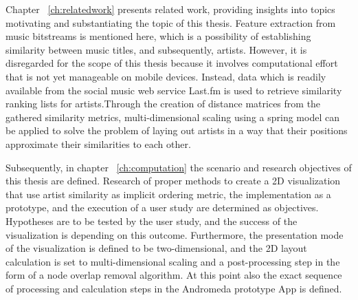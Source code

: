 Chapter ~\ref{ch:relatedwork} presents related work, providing insights into topics motivating and substantiating the topic of this thesis. Feature extraction from music bitstreams is mentioned here, which is a possibility of establishing similarity between music titles, and subsequently, artists. However, it is disregarded for the scope of this thesis because it involves computational effort that is not yet manageable on mobile devices. Instead, data which is readily available from the social music web service Last.fm is used to retrieve similarity ranking lists for artists.Through the creation of distance matrices from the gathered similarity metrics, multi-dimensional scaling using a spring model can be applied to solve the problem of laying out artists in a way that their positions approximate their similarities to each other.

Subsequently, in chapter ~\ref{ch:computation} the scenario and research objectives of this thesis are defined. Research of proper methods to create a 2D visualization that use artist similarity as implicit ordering metric, the implementation as a prototype, and the execution of a user study are determined as objectives. Hypotheses are to be tested by the user study, and the success of the visualization is depending on this outcome. Furthermore, the presentation mode of the visualization is defined to be two-dimensional, and the 2D layout calculation is set to multi-dimensional scaling and a post-processing step in the form of a node overlap removal algorithm. At this point also the exact sequence of processing and calculation steps in the Andromeda prototype App is defined.

